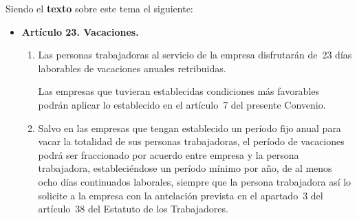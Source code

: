 \begin{enumerate}
\begin{enumerate}
        Siendo el \textbf{texto} sobre este tema el siguiente:

        \begin{itemize}
            \item \textbf{Artículo 23. Vacaciones.}
            \begin{enumerate}
                \item Las personas trabajadoras al servicio de la empresa disfrutarán de 23 días laborables de vacaciones anuales retribuidas.

                Las empresas que tuvieran establecidas condiciones más favorables podrán aplicar lo establecido en el artículo 7 del presente Convenio.

                \item Salvo en las empresas que tengan establecido un período fijo anual para vacar la totalidad de sus personas trabajadoras, el período de vacaciones podrá ser fraccionado por acuerdo entre empresa y la persona trabajadora, estableciéndose un período mínimo por año, de al menos ocho días continuados laborales, siempre que la persona trabajadora así lo solicite a la empresa con la antelación prevista en el apartado 3 del artículo 38 del Estatuto de los Trabajadores.
            \end{enumerate}
        \end{itemize}
    \end{enumerate}
\end{enumerate}









\newpage



